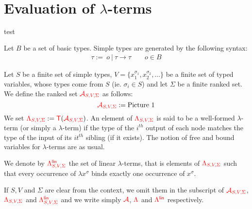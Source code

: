 \section{Evaluation of $\lambda$-terms}
\label{sec:eval}
test
 \newcommand{\rlambda}{\ranked{\Lambda}}
 \newcommand{\rlambdalin}{\ranked{\Lambda^{\sf{lin}}}}
 \newcommand{\rlambdathin}{\ranked{\Lambda^{\sf{thin}}}}
\newcommand{\pictureline}[2]{\\   \begin{minipage}{0,6\textwidth}
    #1 
\end{minipage} & \begin{minipage}{0,4\textwidth}#2\end{minipage} \\}

\begin{definition}
Let $B$ be a set of basic types. Simple types are generated by the following syntax: 
\begin{align*}
\tau:= \ o\ |\  \tau\rightarrow \tau \qquad o\in B
\end{align*}
\end{definition}

\begin{definition}
Let $S$ be a finite set of simple types, $V=\{x_1^{\sigma_1},x_2^{\sigma_2},\dots\}$ be a finite set of typed variables, whose types come from $S$ (ie. $\sigma_i \in S$) and let  $\Sigma$ be a finite ranked set. 
We define the ranked set ${\color{red}{\mathcal{A}_{S,V,\Sigma}}}$ as follows:
 $${\color{red}{\mathcal{A}_{S,V,\Sigma}}}:= \text{Picture 1} $$
We set ${\color{red}{\Lambda_{S,V,\Sigma}}}:={\color{red}{\mathsf T}}({\color{red}{\mathcal{A}_{S,V,\Sigma}}})$. An element of ${\color{red}{\Lambda_{S,V,\Sigma}}}$ is said to be a well-formed $\lambda$-term (or simply a $\lambda$-term) if the type of the $i^{th}$ output of each node matches the type of the input of its $it^{th}$ sibling (if it exists). The notion of free and bound variables for $\lambda$-terms are as usual.

\medskip
\noindent We denote by ${\color{red}{\Lambda^{\sf{lin}}_{S,V,\Sigma}}}$ the set of linear $\lambda$-terms, that is elements of ${\color{red}{\Lambda_{S,V,\Sigma}}}$ such that every occurrence of $\lambda x^\sigma$ binds exactly one occurrence of $x^\sigma$.

\medskip
\noindent If $S, V$ and $\Sigma$ are clear from the context, we omit them in the subscript of ${\color{red}{\mathcal{A}_{S,V,\Sigma}}}$, ${\color{red}{\Lambda_{S,V,\Sigma}}}$ and ${\color{red}{\Lambda^{\sf{lin}}_{S,V,\Sigma}}}$ and we write simply ${\color{red}{\mathcal{A}}}$, $\rlambda$ and $\rlambdalin$ respectively.
\end{definition}

